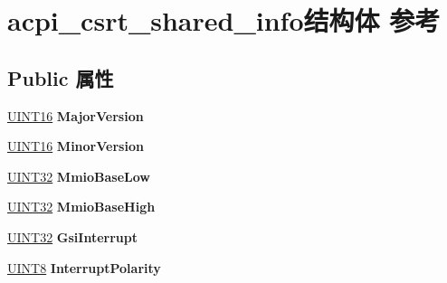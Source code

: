 \hypertarget{structacpi__csrt__shared__info}{}\section{acpi\+\_\+csrt\+\_\+shared\+\_\+info结构体 参考}
\label{structacpi__csrt__shared__info}
\subsection*{Public 属性}
\begin{DoxyCompactItemize}
\item 
\mbox{\label{structacpi__csrt__shared__info_a1e42731213aa79e42c0648728dcbb598}} 
\hyperlink{_processor_bind_8h_a09f1a1fb2293e33483cc8d44aefb1eb1}{U\+I\+N\+T16} {\bfseries Major\+Version}
\item 
\mbox{\label{structacpi__csrt__shared__info_a27ce8920c1001e533dcef271b0a6ce9d}} 
\hyperlink{_processor_bind_8h_a09f1a1fb2293e33483cc8d44aefb1eb1}{U\+I\+N\+T16} {\bfseries Minor\+Version}
\item 
\mbox{\label{structacpi__csrt__shared__info_a8b57b729b4cd3dbe35bc57946c794903}} 
\hyperlink{_processor_bind_8h_ae1e6edbbc26d6fbc71a90190d0266018}{U\+I\+N\+T32} {\bfseries Mmio\+Base\+Low}
\item 
\mbox{\label{structacpi__csrt__shared__info_a4144b1dd468153980e6b9e2384fcac4b}} 
\hyperlink{_processor_bind_8h_ae1e6edbbc26d6fbc71a90190d0266018}{U\+I\+N\+T32} {\bfseries Mmio\+Base\+High}
\item 
\mbox{\label{structacpi__csrt__shared__info_aaccecf09f9e3c433785ea970e9dc38bd}} 
\hyperlink{_processor_bind_8h_ae1e6edbbc26d6fbc71a90190d0266018}{U\+I\+N\+T32} {\bfseries Gsi\+Interrupt}
\item 
\mbox{\label{structacpi__csrt__shared__info_abaaa1e4636e13555f534de10d297319f}} 
\hyperlink{_processor_bind_8h_ab27e9918b538ce9d8ca692479b375b6a}{U\+I\+N\+T8} {\bfseries Interrupt\+Polarity}
\item 
\mbox{\label{structacpi__csrt__shared__info_a863efbdd95a9042e28a4b08b226ea55d}} 

\end{DoxyCompactItemize}

